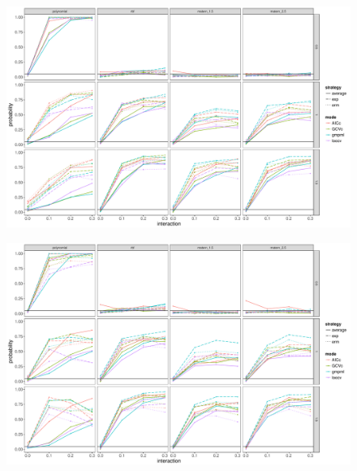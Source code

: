 \documentclass{beamer}
\begin{document}
\begin{frame}
\label{rbf}
\begin{figure}
\centering
\includegraphics[width=\linewidth]{"./plot/rbf"}
\end{figure}
\end{frame}


\begin{frame}
\label{poly_rbf}
\begin{figure}
\centering
\includegraphics[width=\linewidth]{"./plot/poly_rbf"}
\end{figure}
\end{frame}
\end{document}
